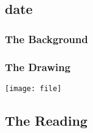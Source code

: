 \subsection{date}
\subsubsection*{The Background}

\subsubsection*{The Drawing}
\begin{itemize}
\end{itemize}
\texttt{[image: file]}

\subsection*{The Reading}

